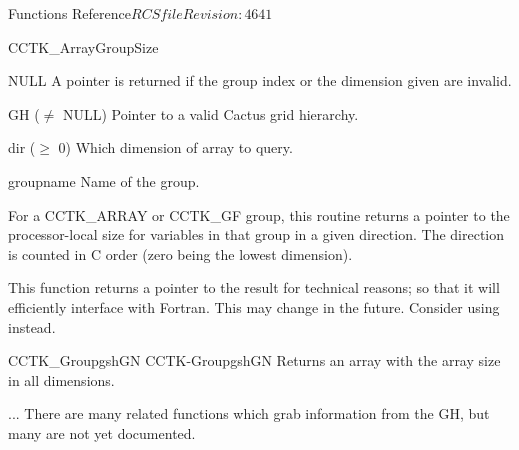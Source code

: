 \begin{cactuspart}{ Functions Reference}{$RCSfile$}{$Revision: 4641 $}
\begin{FunctionDescription}{CCTK\_ArrayGroupSize}{}
\begin{ResultSection}
\begin{Result}{NULL}
A  pointer is returned if the group index or the dimension given are invalid.
\end{Result}
\end{ResultSection}

\begin{ParameterSection}
\begin{Parameter}{GH ($\ne$ NULL)}
Pointer to a valid Cactus grid hierarchy.
\end{Parameter}
\begin{Parameter}{dir ($\ge$ 0)}
Which dimension of array to query.
\end{Parameter}
\begin{Parameter}{groupname}
Name of the group.
\end{Parameter}
\end{ParameterSection}

\begin{Discussion}
For a CCTK\_ARRAY or CCTK\_GF group, this routine returns a pointer to
the processor-local size for variables in that group in a given
direction. The direction is counted in C order (zero being the lowest
dimension).

This function returns a pointer to the result for technical reasons;
so that it will efficiently interface with Fortran.  This may change
in the future.  Consider using  instead.
\end{Discussion}

\begin{SeeAlsoSection}
\begin{SeeAlso2} {CCTK\_GroupgshGN} {CCTK-GroupgshGN}
Returns an array with the array size in all dimensions.
\end{SeeAlso2}
\begin{SeeAlso}{...}
There are many related functions which grab information from the GH,
but many are not yet documented.
\end{SeeAlso}
\end{SeeAlsoSection}
\end{FunctionDescription}



\end{cactuspart}
